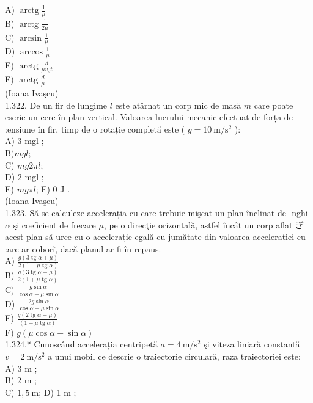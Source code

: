 \documentclass[10pt]{article}
\begin{document}
A) $\operatorname{arctg} \frac{1}{\mu}$\\
B) $\operatorname{arctg} \frac{1}{2 \mu}$\\
C) $\arcsin \frac{1}{\mu}$\\
D) $\arccos \frac{1}{\mu}$\\
E) $\operatorname{arctg} \frac{d}{\mu v_{o} t}$\\
F) $\operatorname{arctg} \frac{d}{\mu}$\\
(Ioana Ivaşcu)\\
1.322. De un fir de lungime $l$ este atârnat un corp mic de masă $m$ care poate escrie un cerc în plan vertical. Valoarea lucrului mecanic efectuat de forța de :ensiune în fir, timp de o rotație completă este ( $g=10 \mathrm{~m} / \mathrm{s}^{2}$ ):\\
A) 3 mgl ;\\
$\mathrm{B}) m g l$;\\
C) $m g 2 \pi l$;\\
D) 2 mgl ;\\
E) $m g \pi l$; F) 0 J .\\
(Ioana Ivaşcu)\\
1.323. Să se calculeze accelerația cu care trebuie mişcat un plan înclinat de -nghi $\alpha$ şi coeficient de frecare $\mu$, pe o direcţie orizontală, astfel încât un corp aflat ぎ acest plan să urce cu o accelerație egală cu jumătate din valoarea accelerației cu :are ar coborî, dacă planul ar fi în repaus.\\
A) $\frac{g(3 \operatorname{tg} \alpha+\mu)}{2(1-\mu \operatorname{tg} \alpha)}$\\
B) $\frac{g(3 \operatorname{tg} \alpha+\mu)}{2(1+\mu \operatorname{tg} \alpha)}$\\
C) $\frac{g \sin \alpha}{\cos \alpha-\mu \sin \alpha}$\\
D) $\frac{2 g \sin \alpha}{\cos \alpha-\mu \sin \alpha}$\\
E) $\frac{g(2 \operatorname{tg} \alpha+\mu)}{(1-\mu \operatorname{tg} \alpha)}$\\
F) $g(\mu \cos \alpha-\sin \alpha)$\\
1.324.* Cunoscând accelerația centripetă $a=4 \mathrm{~m} / \mathrm{s}^{2}$ şi viteza liniară constantă $v=2 \mathrm{~m} / \mathrm{s}^{2}$ a unui mobil ce descrie o traiectorie circulară, raza traiectoriei este:\\
A) 3 m ;\\
B) 2 m ;\\
C) $1,5 \mathrm{~m}$; D) 1 m ;\\
\end{document}
